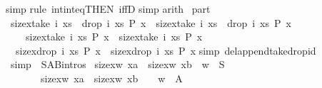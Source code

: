 \begin{isabellebody}
simp{\isacharparenright}\isanewline
{}rule\ int{\isacharunderscore}int{\isacharunderscore}eq{\isacharbrackleft}THEN\ iffD{}{\isacharbrackright}{\isacharparenright}\isanewline
{}simp{\isacharparenright}\isanewline
{}arith{\isacharparenright}\isanewline
\isanewline
{}\ part{}{\isacharcolon}\isanewline
{\isachardoublequote}{\isacharbrackleft}{\isacharbar}\ size{\isacharbrackleft}x{\isacharcolon}take\ i\ xs\ {\isacharat}\ drop\ i\ xs{\isachardot}\ P\ x{\isacharbrackright}\ {\isacharequal}\ size{\isacharbrackleft}x{\isacharcolon}take\ i\ xs\ {\isacharat}\ drop\ i\ xs{\isachardot}\ {\isachartilde}P\ x{\isacharbrackright}{\isacharplus}{}{\isacharsemicolon}\isanewline
\ \ \ \ size{\isacharbrackleft}x{\isacharcolon}take\ i\ xs{\isachardot}\ P\ x{\isacharbrackright}\ {\isacharequal}\ size{\isacharbrackleft}x{\isacharcolon}take\ i\ xs{\isachardot}\ {\isachartilde}P\ x{\isacharbrackright}{\isacharplus}{}\ {\isacharbar}{\isacharbrackright}\isanewline
\ {\isacharequal}{\isacharequal}{\isachargreater}\ size{\isacharbrackleft}x{\isacharcolon}drop\ i\ xs{\isachardot}\ P\ x{\isacharbrackright}\ {\isacharequal}\ size{\isacharbrackleft}x{\isacharcolon}drop\ i\ xs{\isachardot}\ {\isachartilde}P\ x{\isacharbrackright}{\isacharplus}{}{\isachardoublequote}\isanewline
{}simp\ del{\isacharcolon}append{\isacharunderscore}take{\isacharunderscore}drop{\isacharunderscore}id{\isacharparenright}\isanewline
\isanewline
{}\ {\isacharbrackleft}simp{\isacharbrackright}\ {\isacharequal}\ S{\isacharunderscore}A{\isacharunderscore}B{\isachardot}intros\isanewline
\isanewline
{}\ {\isachardoublequote}{\isacharparenleft}size{\isacharbrackleft}x{\isacharcolon}w{\isachardot}\ x{\isacharequal}a{\isacharbrackright}\ {\isacharequal}\ size{\isacharbrackleft}x{\isacharcolon}w{\isachardot}\ x{\isacharequal}b{\isacharbrackright}\ {\isacharminus}{\isacharminus}{\isachargreater}\ w\ {\isacharcolon}\ S{\isacharparenright}\ {\isacharampersand}\isanewline
\ \ \ \ \ \ \ {\isacharparenleft}size{\isacharbrackleft}x{\isacharcolon}w{\isachardot}\ x{\isacharequal}a{\isacharbrackright}\ {\isacharequal}\ size{\isacharbrackleft}x{\isacharcolon}w{\isachardot}\ x{\isacharequal}b{\isacharbrackright}\ {\isacharplus}\ {}\ {\isacharminus}{\isacharminus}{\isachargreater}\ w\ {\isacharcolon}\ A{\isacharparenright}\ {\isacharampersand}\isanewline

\end{isabellebody}

